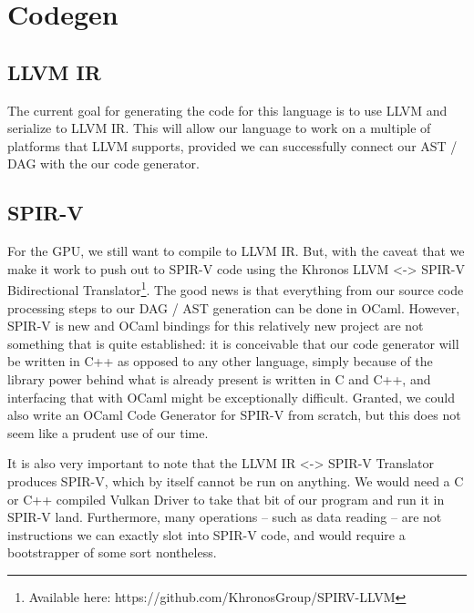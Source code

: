 \chapter{Codegen}

\section{LLVM IR}
The current goal for generating the code for this language is to use LLVM and serialize to LLVM IR. This will allow our language to work on a multiple of platforms that LLVM supports, provided we can successfully connect our AST / DAG with the our code generator.

\section{SPIR-V}
For the GPU, we still want to compile to LLVM IR. But, with the caveat that we make it work to push out to SPIR-V code using the Khronos LLVM <-> SPIR-V Bidirectional Translator\cite{spirv-llvm}\footnote{Available here: https://github.com/KhronosGroup/SPIRV-LLVM}. The good news is that everything from our source code processing steps to our DAG / AST generation can be done in OCaml. However, SPIR-V is new and OCaml bindings for this relatively new project are not something that is quite established: it is conceivable that our code generator will be written in C++ as opposed to any other language, simply because of the library power behind what is already present is written in C and C++, and interfacing that with OCaml might be exceptionally difficult. Granted, we could also write an OCaml Code Generator for SPIR-V from scratch, but this does not seem like a prudent use of our time.

It is also very important to note that the LLVM IR <-> SPIR-V Translator produces SPIR-V, which by itself cannot be run on anything. We would need a C or C++ compiled Vulkan Driver to take that bit of our program and run it in SPIR-V land. Furthermore, many operations -- such as data reading -- are not instructions we can exactly slot into SPIR-V code, and would require a bootstrapper of some sort nontheless.